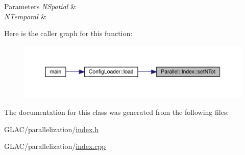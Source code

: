 \begin{DoxyParams}{Parameters}
{\em N\+Spatial} & \\
\hline
{\em N\+Temporal} & \\
\hline
\end{DoxyParams}
Here is the caller graph for this function\+:\nopagebreak
\begin{figure}[H]
\begin{center}
\leavevmode
\includegraphics[width=350pt]{class_parallel_1_1_index_a125dc4d990ded636c91b959474c27d1f_icgraph}
\end{center}
\end{figure}


The documentation for this class was generated from the following files\+:\begin{DoxyCompactItemize}
\item 
G\+L\+A\+C/parallelization/\mbox{\hyperlink{index_8h}{index.\+h}}\item 
G\+L\+A\+C/parallelization/\mbox{\hyperlink{index_8cpp}{index.\+cpp}}\end{DoxyCompactItemize}
